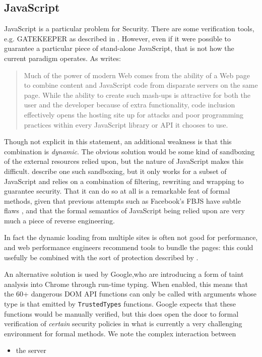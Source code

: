 \documentclass{eptcs}
\begin{document}
\subsection{JavaScript}
JavaScript is a particular problem for Security. There are some verification tools, e.g. GATEKEEPER as described in \cite{GuarnieriLivshits2009}. However, even if it were possible to guarantee a particular piece of stand-alone JavaScript, that is not how the current paradigm operates. As \cite{MeyerovichLivshits2010a} writes:
\begin{quote}
Much of the power of modern Web comes from the
ability of a Web page to combine content and JavaScript code
from disparate servers on the same page. While the ability
to create such mash-ups is attractive for both the user and
the developer because of extra functionality, code inclusion
effectively opens the hosting site up for attacks and poor
programming practices within every JavaScript library or API
it chooses to use.
\end{quote}
Though not explicit in this statement, an additional weakness is that this combination is \emph{dynamic}.
The obvious solution would be some kind of sandboxing of the external resources relied upon, but the nature of JavaScript makes this difficult.  \cite{Maffeisetal2009} describe one such sandboxing, but it only works for a subset of JavaScript and relies on a combination of filtering, rewriting and wrapping to guarantee security. That it can do so at all is a remarkable feat of formal methods, given that previous attempts such as Facebook's FBJS have subtle flaws \cite{MaffeisTaly2009}, and that the formal semantics of JavaScript being relied upon are very much a piece of reverse engineering.
\par
In fact the dynamic loading from multiple sites is often not good for performance, and web performance engineers recommend tools to bundle the pages: this could usefully be combined with the sort of protection described by \cite{Maffeisetal2009}.
\par
An alternative solution is used by Google,who are introducing a form of taint analysis into Chrome \cite{Kotowicz2019a} through run-time typing. When enabled, this means that the 60+ dangerous DOM API functions can only be called with arguments whose type is that emitted by \verb+TrustedTypes+ functions. Google expects that these functions would be manually verified, but this does open the door to formal verification of \emph{certain} security policies in what is currently a very challenging environment for formal methods. We note the complex interaction between
\begin{itemize}
\item the  server
\end{itemize}
\end{document}
